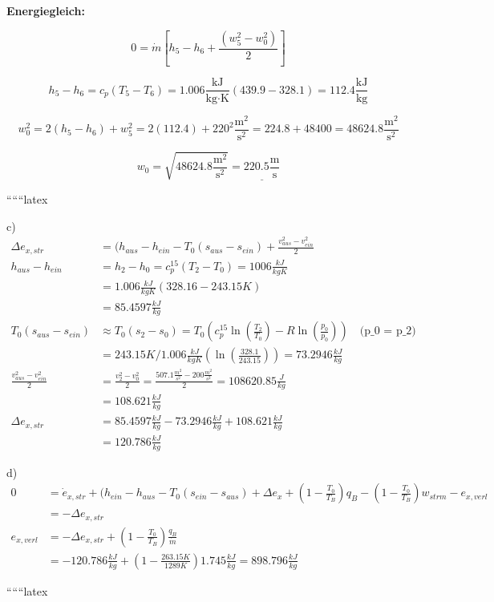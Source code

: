 \textbf{Energiegleich:}

\begin{equation*}
    0 = \dot{m} \left[ h_5 - h_6 + \frac{(w_5^2 - w_0^2)}{2} \right]
\end{equation*}

\begin{equation*}
    h_5 - h_6 = c_p \left( T_5 - T_6 \right) = 1.006 \frac{\text{kJ}}{\text{kg} \cdot \text{K}} (439.9 - 328.1) = 112.4 \frac{\text{kJ}}{\text{kg}}
\end{equation*}

\begin{equation*}
    w_0^2 = 2 (h_5 - h_6) + w_5^2 = 2 (112.4) + 220^2 \frac{\text{m}^2}{\text{s}^2} = 224.8 + 48400 = 48624.8 \frac{\text{m}^2}{\text{s}^2}
\end{equation*}

\begin{equation*}
    w_0 = \sqrt{48624.8 \frac{\text{m}^2}{\text{s}^2}} = \underline{220.5 \frac{\text{m}}{\text{s}}}
\end{equation*}

``````latex


c)
\begin{align*}
\Delta e_{x,str} &= (h_{aus} - h_{ein} - T_0 (s_{aus} - s_{ein}) + \frac{v_{aus}^2 - v_{ein}^2}{2} \\
h_{aus} - h_{ein} &= h_2 - h_0 = c_p^{15} (T_2 - T_0) = 1006 \frac{kJ}{kgK} \\
&= 1.006 \frac{kJ}{kgK} (328.16 - 243.15 K) \\
&= 85.4597 \frac{kJ}{kg} \\
T_0 (s_{aus} - s_{ein}) &\approx T_0 (s_2 - s_0) = T_0 \left( c_p^{15} \ln \left( \frac{T_2}{T_0} \right) - R \ln \left( \frac{p_0}{p_0} \right) \right) \quad \text{(p_0 = p_2)} \\
&= 243.15 K / 1.006 \frac{kJ}{kgK} \left( \ln \left( \frac{328.1}{243.15} \right) \right) = 73.2946 \frac{kJ}{kg} \\
\frac{v_{aus}^2 - v_{ein}^2}{2} &= \frac{v_2^2 - v_0^2}{2} = \frac{507.1 \frac{m^2}{s^2} - 200 \frac{m^2}{s^2}}{2} = 108620.85 \frac{J}{kg} \\
&= 108.621 \frac{kJ}{kg} \\
\Delta e_{x,str} &= 85.4597 \frac{kJ}{kg} - 73.2946 \frac{kJ}{kg} + 108.621 \frac{kJ}{kg} \\
&= 120.786 \frac{kJ}{kg}
\end{align*}

d)
\begin{align*}
0 &= \dot{e}_{x,str} + (h_{ein} - h_{aus} - T_0 (s_{ein} - s_{aus}) + \Delta e_{x} + \left( 1 - \frac{T_0}{T_B} \right) q_B - \left( 1 - \frac{T_0}{T_B} \right) w_{strm} - e_{x,verl} \\
&= -\Delta e_{x,str} \\
e_{x,verl} &= -\Delta e_{x,str} + \left( 1 - \frac{T_0}{T_B} \right) \frac{q_B}{\dot{m}} \\
&= -120.786 \frac{kJ}{kg} + \left( 1 - \frac{263.15 K}{1289 K} \right) 1.745 \frac{kJ}{kg} = 898.796 \frac{kJ}{kg}
\end{align*}

``````latex


